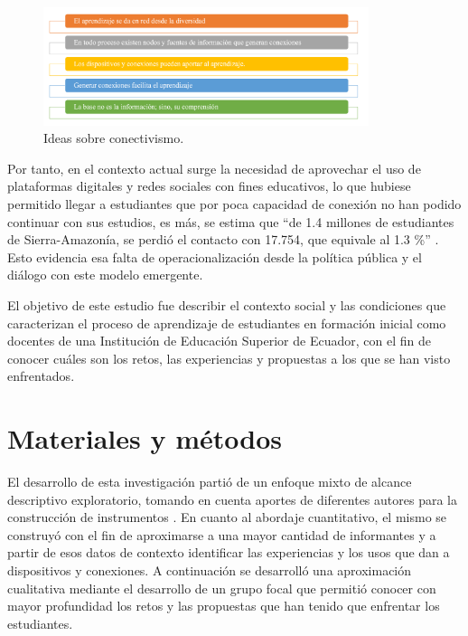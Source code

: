 \documentclass{textolivre}
\begin{document}
\begin{figure}[htbp]
 \centering
 \includegraphics[width=0.85\textwidth]{Fig02.jpg}
 \caption{Ideas sobre conectivismo.}
 \label{Fig02}
\end{figure}

Por tanto, en el contexto actual surge la necesidad de aprovechar el uso de plataformas digitales y redes sociales con fines educativos, lo que hubiese permitido llegar a estudiantes que por poca capacidad de conexión no han podido continuar con sus estudios, es más, se estima que “de 1.4 millones de estudiantes de Sierra-Amazonía, se perdió el contacto con 17.754, que equivale al 1.3 \%” \cite[párr. 6]{el_comercio_rastro_2020}. Esto evidencia esa falta de operacionalización desde la política pública y el diálogo con este modelo emergente. 

El objetivo de este estudio fue describir el contexto social y las condiciones que caracterizan el proceso de aprendizaje de estudiantes en formación inicial como docentes de una Institución de Educación Superior de Ecuador, con el fin de conocer cuáles son los retos, las experiencias y propuestas a los que se han visto enfrentados.

\section{Materiales y métodos}\label{sec-normas}
El desarrollo de esta investigación partió de un enfoque mixto de alcance descriptivo exploratorio, tomando en cuenta aportes de diferentes autores para la construcción de instrumentos \cite{restrepo_mesa_metodos_2020, pereira_perez_disenos_2011, hernandez_sampieri_metodologiinvestigacion_2014}. En cuanto al abordaje cuantitativo, el mismo se construyó con el fin de aproximarse a una mayor cantidad de informantes y a partir de esos datos de contexto identificar las experiencias y los usos que dan a dispositivos y conexiones. A continuación se desarrolló una aproximación cualitativa mediante el desarrollo de un grupo focal que permitió conocer con mayor profundidad los retos y las propuestas que han tenido que enfrentar los estudiantes.
\end{document}
